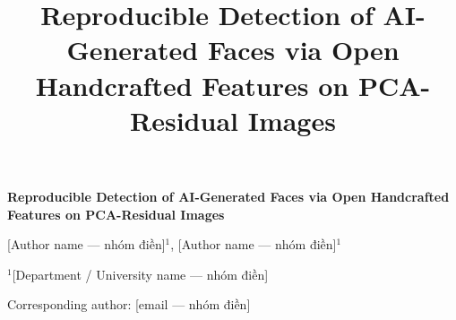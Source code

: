 \documentclass[11pt]{article}
\title{\large Reproducible Detection of AI-Generated Faces via Open Handcrafted Features on PCA-Residual Images}
\author{}
\date{}
\begin{document}
\pagestyle{plain}

\begin{center}
{\LARGE \bfseries Reproducible Detection of AI-Generated Faces via Open Handcrafted Features on PCA-Residual Images}

\vspace{1em}
{\large [Author name --- nhóm điền]$^{1}$, [Author name --- nhóm điền]$^{1}$}

\vspace{0.5em}
$^{1}$[Department / University name --- nhóm điền]

\vspace{0.5em}
Corresponding author: [email --- nhóm điền]
\end{center}

\vspace{1em}
\end{document}

